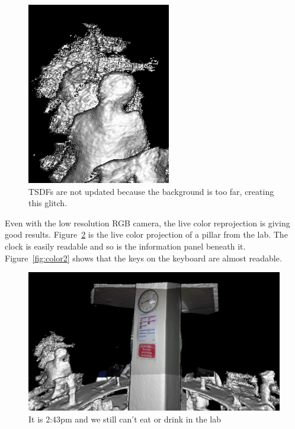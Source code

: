 \documentclass[12pt, twoside]{article}
\begin{document}
\begin{figure}[!h]
  \centering
  \includegraphics[scale=0.5]{glitch3.png}
  \caption{\label{fig:glitch3} TSDFs are not updated because the background is too far, creating this glitch.}
\end{figure}

Even with the low resolution RGB camera, the live color reprojection is giving good results. Figure~\ref{fig:color1} is the live color projection of a pillar from the lab. The clock is easily readable and so is the information panel beneath it. Figure~\ref{fig:color2} shows that the keys on the keyboard are almost readable.

\begin{figure}[!h]
  \centering
  \includegraphics[scale=0.33]{Color1.png}
  \caption{\label{fig:color1} It is 2:43pm and we still can't eat or drink in the lab}
\end{figure}
\end{document}
